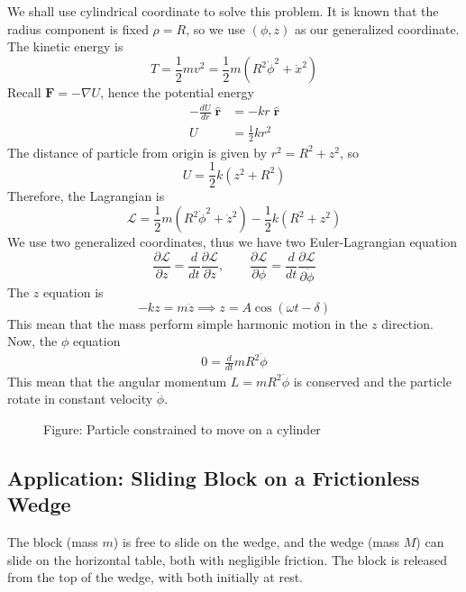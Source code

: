 \documentclass[../../../main.tex]{subfiles}
\begin{document}
We shall use cylindrical coordinate to solve this problem.
It is known that the radius component is fixed $\rho=R$, so we use $(\phi, z)$ as our generalized coordinate.
The kinetic energy is
\begin{equation*}
	T=\frac{1}{2}mv^2=\frac{1}{2}m(R^2\dot{\phi}^2+\dot{x}^2)
\end{equation*}
Recall $\mathbf{F}=-\nabla U$, hence the potential energy
\begin{align*}
	-\frac{dU}{dr}\;\mathbf{\hat{r}} & =-kr\;\mathbf{\hat{r}} \\
	U                                & =\frac{1}{2}kr^2
\end{align*}
The distance of particle from origin is given by $r^2=R^2+z^2$, so
\begin{equation*}
	U=\frac{1}{2}k(z^2+R^2)
\end{equation*}
Therefore, the Lagrangian is
\begin{equation*}
	\mathcal{L}=\frac{1}{2}m(R^2\dot{\phi}^2+\dot{z}^2)-\frac{1}{2}k(R^2+z^2)
\end{equation*}
We use two generalized coordinates, thus we have two Euler-Lagrangian equation
\begin{equation*}
	\frac{\partial \mathcal{L}}{\partial z}=\frac{d}{dt}\frac{\partial \mathcal{L}}{\partial \dot{z}},\qquad\frac{\partial\mathcal{L}}{\partial \phi}=\frac{d}{dt}\frac{\partial\mathcal{L}}{\partial \dot{\phi}}
\end{equation*}
The $z$ equation is
\begin{equation*}
	-kz=m\ddot{z}\implies z=A\cos(\omega t-\delta)
\end{equation*}
This mean that the mass perform simple harmonic motion in the $z$ direction.
Now, the $\phi$ equation
\begin{align*}
	0=\frac{d}{dt}mR^2\dot{\phi}
\end{align*}
This mean that the angular momentum $L=mR^2\dot{\phi}$ is conserved and the particle rotate in constant velocity $\dot{\phi}$.

\begin{figure*}
	\centering
	\caption*{Figure: Particle constrained to move on a cylinder}
\end{figure*}

\subsection{Application: Sliding Block on a Frictionless Wedge}
The block (mass $m$) is free to slide on the wedge, and the wedge (mass $M$) can slide on the horizontal table, both with negligible friction.
The block is released from the top of the wedge, with both initially at rest.
\end{document}
